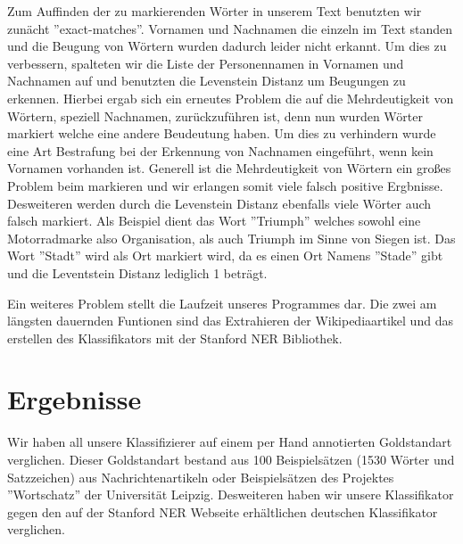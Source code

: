 \documentclass[a4paper]{article}
\begin{document}
	Zum Auffinden der zu markierenden Wörter in unserem Text benutzten wir zunächt ''exact-matches''. Vornamen und Nachnamen die einzeln im Text standen und die Beugung von Wörtern wurden dadurch leider nicht erkannt. 
	Um dies zu verbessern, spalteten wir die Liste der Personennamen in Vornamen und Nachnamen auf und benutzten die Levenstein Distanz um Beugungen zu erkennen. 
	Hierbei ergab sich ein erneutes Problem die auf die Mehrdeutigkeit von Wörtern, speziell Nachnamen, zurückzuführen ist, denn nun wurden Wörter markiert welche eine andere Beudeutung haben. 
	Um dies zu verhindern wurde eine Art Bestrafung bei der Erkennung von Nachnamen eingeführt, wenn kein Vornamen vorhanden ist. 
	Generell ist die Mehrdeutigkeit von Wörtern ein großes Problem beim markieren und wir erlangen somit viele falsch positive Ergbnisse. 
	Desweiteren werden durch die Levenstein Distanz ebenfalls viele Wörter auch falsch markiert. 
	Als Beispiel dient das Wort ''Triumph'' welches sowohl eine Motorradmarke also Organisation, als auch Triumph im Sinne von Siegen ist. Das Wort ''Stadt'' wird als Ort markiert wird, da es einen Ort Namens ''Stade'' gibt und die Leventstein Distanz lediglich 1 beträgt.
	
	Ein weiteres Problem stellt die Laufzeit unseres Programmes dar. 
	Die zwei am längsten dauernden Funtionen sind das Extrahieren der Wikipediaartikel und das erstellen des Klassifikators mit der Stanford NER Bibliothek.
\section{Ergebnisse}
	Wir haben all unsere Klassifizierer auf einem per Hand annotierten Goldstandart verglichen. 
	Dieser Goldstandart bestand aus 100 Beispielsätzen (1530 Wörter und Satzzeichen) aus Nachrichtenartikeln oder Beispielsätzen des Projektes ''Wortschatz'' der Universität Leipzig. Desweiteren haben wir unsere Klassifikator gegen den auf der Stanford NER Webseite erhältlichen deutschen Klassifikator  verglichen.

\newpage
\end{document}
